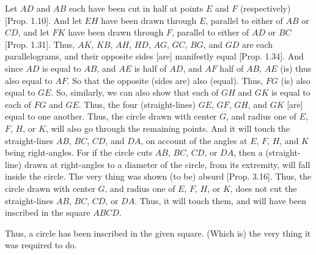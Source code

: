 \begin{Parallel}{}{}
{\epsfysize=2.2in
\centerline{}

Let  $AD$ and $AB$ each have been cut in half at points $E$ and $F$ (respectively)
[Prop. 1.10]. And let $EH$ have been drawn through $E$, parallel
to either of $AB$ or $CD$, and let $FK$ have been drawn through $F$, parallel to either of $AD$ or $BC$ [Prop. 1.31].
Thus, $AK$, $KB$, $AH$, $HD$, $AG$, $GC$, $BG$, and $GD$ are each parallelograms,
and their opposite sides [are] manifestly equal [Prop. 1.34].
And since $AD$ is equal to $AB$, and $AE$ is half of $AD$, and $AF$ half of
$AB$, $AE$ (is) thus also equal to $AF$. So that the opposite (sides are) also (equal).
Thus, $FG$ (is) also equal to $GE$. So, similarly, we can also show that each of
$GH$ and $GK$ is equal to each of $FG$ and $GE$. Thus, the four (straight-lines)
$GE$, $GF$, $GH$, and $GK$ [are] equal to one another. Thus, the circle drawn
with center $G$, and radius one of $E$, $F$, $H$, or $K$, will also go through the remaining points. And it will touch the straight-lines $AB$, $BC$, $CD$, and $DA$,
on account of the angles at $E$, $F$, $H$, and $K$ being right-angles. For if the
circle cuts $AB$, $BC$, $CD$, or $DA$, then a (straight-line) drawn at right-angles to a diameter of the circle, from its extremity, will fall inside the circle. 
The very thing was shown (to be) absurd [Prop. 3.16].  Thus, the
circle drawn with center $G$, and radius one of $E$, $F$, $H$, or $K$, does not
cut the straight-lines $AB$, $BC$, $CD$, or $DA$. Thus, it will touch them, and will
have been inscribed in the square $ABCD$.

Thus, a circle has been inscribed in the given square. (Which is) the very thing it was required to do.}
\end{Parallel}

